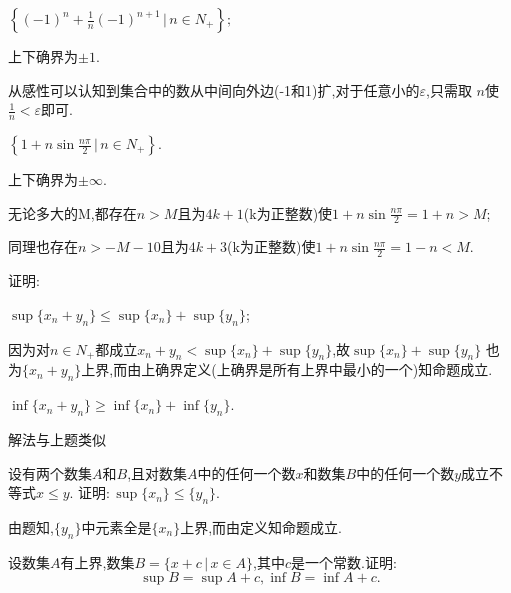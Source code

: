 \documentclass[windows,list,answers]{BHCexam}
\begin{document}
\begin{questions}
\begin{subquestions}
\begin{solution}{1cm}
        \end{solution}

        \subquestion
        $\left\{(-1)^n+\frac{1}{n}(-1)^{n+1}\,\biggl\lvert\, n\in N_+\right\};$
        \begin{solution}{1cm}
            \methodonly
            上下确界为$\pm 1$.

            从感性可以认知到集合中的数从中间向外边(-1和1)扩,对于任意小的$\varepsilon$,只需取
            $n$使$\frac{1}{n}<\varepsilon$即可.
        \end{solution}

        \subquestion
        $\left\{1+n\sin\frac{n\pi}{2}\,\bigg\lvert\, n\in N_+\right\}$.
        \begin{solution}{1cm}
            \methodonly
            上下确界为$\pm \infty$.

            无论多大的M,都存在$n>M$且为$4k+1$(k为正整数)使$1+n\sin\frac{n\pi}{2}=1+n>M$;

            同理也存在$n>-M-10$且为$4k+3$(k为正整数)使$1+n\sin\frac{n\pi}{2}=1-n<M$.
        \end{solution}
    \end{subquestions}

    \question
    证明:
    \begin{subquestions}
        \subquestion
        $\sup\{x_n+y_n\}\leqslant \sup\{x_n\}+\sup\{y_n\}$;
        \begin{solution}{1cm}
            \methodonly
            因为对$n\in N_+$都成立$x_n+y_n<\sup\{x_n\}+\sup\{y_n\}$,故$\sup\{x_n\}+\sup\{y_n\}$
            也为$\{x_n+y_n\}$上界,而由上确界定义(上确界是所有上界中最小的一个)知命题成立.
        \end{solution}

        \subquestion
        $\inf\{x_n+y_n\}\geqslant\inf\{x_n\}+\inf\{y_n\}$.
        \begin{solution}{1cm}
            \methodonly
            解法与上题类似
        \end{solution}
    \end{subquestions}

    \question
    设有两个数集$A$和$B$,且对数集$A$中的任何一个数$x$和数集$B$中的任何一个数$y$成立不等式$x\leqslant y$.
    证明:\,$\sup\{x_n\}\leqslant\{y_n\}$.
    \begin{solution}{1cm}
        \methodonly
        由题知,$\{y_n\}$中元素全是$\{x_n\}$上界,而由定义知命题成立.
    \end{solution}

    \question
    设数集$A$有上界,数集$B=\{x+c\,\lvert\, x\in A\}$,其中$c$是一个常数.证明:\,
    \[\sup B=\sup A+c,\inf B=\inf A+c.
    \]


\end{questions}
\end{document}
